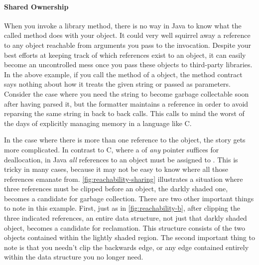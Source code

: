 \paragraph{Shared Ownership}
\label{sec:shared-ownership}

When you invoke a library method, there is no way in Java to know what the called
method does with your object. It could very well squirrel away a reference to any
object reachable from arguments you pass to the invocation. Despite your best
efforts at keeping track of which references exist to an object, it can easily
become an uncontrolled mess once you pass these objects to third-party libraries.
In the above example, if you call the  method of a
 object, the method contract says nothing about how it
treats the given string or  passed as parameters. 
Consider the case where you need the string to become garbage collectable soon
after having parsed it, but the formatter maintains a reference in order to avoid
reparsing the same string in back to back calls. This calls
to mind the worst of the days of explicitly managing memory in a language like C.

In the case where there is more than one reference to the object, the story gets
more complicated. In contrast to C, where a  of \emph{any} pointer
suffices for deallocation, in Java \emph{all} references to an object must be
assigned to . This is tricky in many cases, because it may not be easy
to know where all those references emanate from.
\autoref{fig:reachability-sharing} illustrates a situation where three references
must be clipped before an object, the darkly shaded one, becomes a candidate for
garbage collection. There are two other important things to note in this example.
First, just as in \autoref{fig:reachability-b}, after clipping the three
indicated references, an entire data structure, not just that darkly shaded
object, becomes a candidate for reclamation. This structure consists of the two
objects contained within the lightly shaded region. The second important thing to
note is that you needn't clip the backwards edge, or any edge contained entirely
within the data structure you no longer need.

